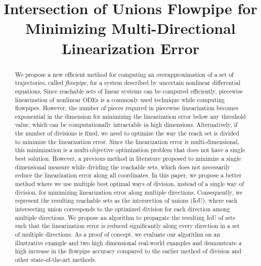 


\title{Intersection of Unions Flowpipe for Minimizing Multi-Directional Linearization Error}
\author{}
\institute{}
%
    
\maketitle
%
\begin{abstract}
We propose a new efficient method for computing an overapproximation
of a set of trajectories, called \emph{flowpipe}, for a system
described by uncertain nonlinear differential equations.  Since
reachable sets of linear systems can be computed efficiently,
piecewise linearization of nonlinear ODEs is a commonly used technique
while computing flowpipes.  However, the number of pieces required in
piecewise linearization becomes exponential in the dimension for
minimizing the linearization error below any threshold value, which
can be computationally intractable in high dimensions.  Alternatively,
if the number of divisions is fixed, we need to optimize the way the
reach set is divided to minimize the linearization error.  Since the
linearization error is multi-dimensional, this minimization is a
multi-objective optimization problem that does not have a single best
solution.  However, a previous method in literature proposed to
minimize a single dimensional measure while dividing the reachable
sets, which does not necessarily reduce the linearization error along
all coordinates.  In this paper, we propose a better method where we
use multiple best optimal ways of division, instead of a single way of
division, for minimizing linearization error along multiple
directions.  Consequently, we represent the resulting reachable sets
as the intersection of unions (IoU), where each intersecting union
corresponds to the optimized division for each direction among
multiple directions.  We propose an algorithm to propagate the
resulting IoU of sets such that the linearization error is reduced
significantly along every direction in a set of multiple directions.
As a proof of concept, we evaluate our algorithm on an illustrative
example and two high dimensional real-world examples and demonstrate a
high increase in the flowpipe accuracy compared to the earlier method
of division and other state-of-the-art methods.
\end{abstract}


